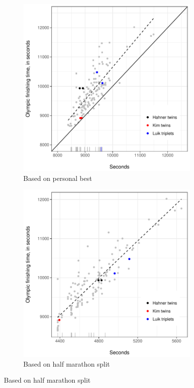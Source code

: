 \documentclass[12pt,titlepage]{article}
\begin{document}
\begin{figure}[!ht]
  \centering
  \caption{Olympic finishing times as a function of underlying marathon talent}
  \label{fig:scatter}
  \begin{subfigure}{.495\textwidth}
    \centering
    \includegraphics[width=\textwidth, keepaspectratio]{scatter_plot_no_quadratic.pdf}
    \caption{Based on personal best} 
    \label{fig:45degreeplot}
  \end{subfigure}
  \begin{subfigure}{.495\textwidth}
    \centering
    \includegraphics[width=\textwidth, keepaspectratio]{scatter_plot_half_no_quadratic.pdf}
    \caption{Based on half marathon split} 
    \label{fig:45degreeplot_half}
  \end{subfigure}
\end{figure}
\end{document}
